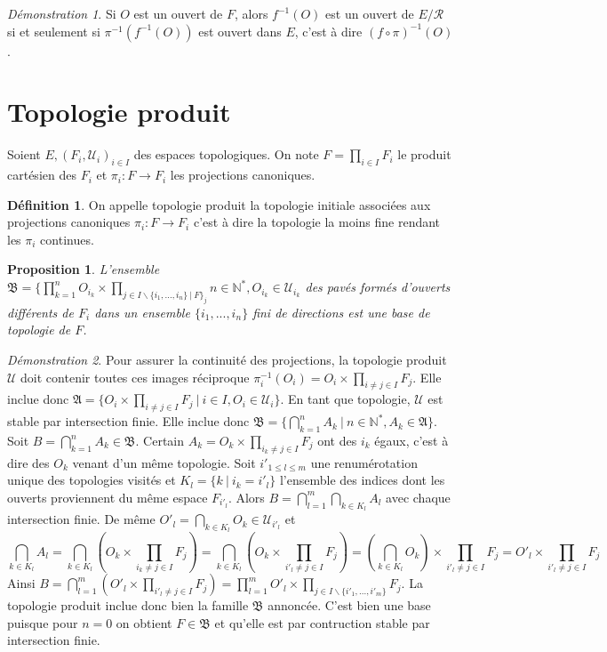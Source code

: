 \documentclass[a4paper, 11pt, french]{book}
\theoremstyle{plain} %
\newtheorem{proposition}{Proposition}
\theoremstyle{definition} %
\newtheorem{definition}{Définition}
\theoremstyle{remark} %
\newtheorem*{demonstration}{Démonstration}
\renewcommand{\setminus}{\backslash}
\newcommand{\1}{\mathds{1}}
\newcommand{\infegal}{\leqslant}
\newcommand{\inv}[1]{#1^{-1}}
\newcommand{\N}{\mathbb{N}}
\newcommand\ens[2]{\{#1 \ |\ #2\}}
\begin{document}
\begin{demonstration}
	Si $O$ est un ouvert de $F$, alors $\inv{f}(O)$ est un ouvert de $E/\mathcal{R}$ si et seulement si $\inv{\pi}(\inv{f}(O))$ est ouvert dans $E$, c'est à dire $\inv{(f\circ\pi)}(O)$.
\end{demonstration}

\section{Topologie produit}

Soient $E, (F_i, \mathscr{U}_i)_{i\in I}$ des espaces topologiques.
On note $F=\prod_{i\in I} F_i$ le produit cartésien des $F_i$ et $\pi_i\colon F\rightarrow F_i$ les projections canoniques.

\begin{definition}
	On appelle topologie produit la topologie initiale associées aux projections canoniques $\pi_i\colon F\rightarrow F_i$ c'est à dire la topologie la moins fine rendant les $\pi_i$ continues.
\end{definition}

\begin{proposition}
	L'ensemble $\mathfrak{B}=\{\prod_{k=1}^nO_{i_k}\times\prod_{j\in I\setminus\ens{i_1, ..., i_n\}}F_j}{n\in\N^*, O_{i_k}\in\mathscr{U}_{i_k}}$ des pavés formés d'ouverts différents de $F_i$ dans un ensemble $\{i_1,...,i_n\}$ fini de directions est une base de topologie de $F$.
\end{proposition}

\begin{demonstration}
	Pour assurer la continuité des projections, la topologie produit $\mathscr{U}$ doit contenir toutes ces images réciproque $\inv{\pi_i}(O_i)=O_i\times\prod_{i\neq j\in I}F_j$.
	Elle inclue donc $\mathfrak{A}=\ens{O_i\times\prod_{i\neq j\in I}F_j}{i\in I, O_i\in\mathscr{U}_i}$.
	En tant que topologie, $\mathscr{U}$ est stable par intersection finie.
	Elle inclue donc $\mathfrak{B}=\ens{\bigcap_{k=1}^nA_k}{n\in\N^*, A_k\in\mathfrak{A}}$.
	Soit $B=\bigcap_{k=1}^nA_k\in\mathfrak{B}$.
	Certain $A_k=O_k\times\prod_{i_k\neq j\in I}F_j$ ont des $i_k$ égaux, c'est à dire des $O_k$ venant d'un même topologie.
	Soit $i'_{1\infegal l\infegal m}$ une renumérotation unique des topologies visités et $K_l=\ens{k}{i_k=i'_l}$ l'ensemble des indices dont les ouverts proviennent du même espace $F_{i'_l}$.
	Alors $B=\bigcap_{l=1}^m\bigcap_{k\in K_l}A_l$ avec chaque intersection finie.
	De même $O'_l=\bigcap_{k\in K_l}O_k\in\mathscr{U}_{i'_l}$ et
	$$
		\bigcap_{k\in K_l}A_l
		=\bigcap_{k\in K_l}(O_k\times\prod_{i_k\neq j\in I}F_j)
		=\bigcap_{k\in K_l}(O_k\times\prod_{i'_l\neq j\in I}F_j)
		=(\bigcap_{k\in K_l}O_k)\times\prod_{i'_l\neq j\in I}F_j
		=O'_l\times\prod_{i'_l\neq j\in I}F_j
	$$
	Ainsi $B=\bigcap_{l=1}^m(O'_l\times\prod_{i'_l\neq j\in I}F_j)=\prod_{l=1}^mO'_l\times\prod_{j\in I\setminus\{i'_1,...,i'_m\}}F_j$.
	La topologie produit inclue donc bien la famille $\mathfrak{B}$ annoncée.
	C'est bien une base puisque pour $n=0$ on obtient $F\in\mathfrak{B}$ et qu'elle est par contruction stable par intersection finie.
\end{demonstration}
\end{document}
